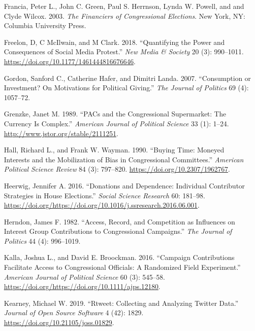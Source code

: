 \documentclass[12pt,]{article}
\begin{document}
\leavevmode\hypertarget{ref-francia2003}{}%
Francia, Peter L., John C. Green, Paul S. Herrnson, Lynda W. Powell, and
and Clyde Wilcox. 2003. \emph{The Financiers of Congressional
Elections}. New York, NY: Columbia University Press.

\leavevmode\hypertarget{ref-freelon2018}{}%
Freelon, D, C McIlwain, and M Clark. 2018. ``Quantifying the Power and
Consequences of Social Media Protest.'' \emph{New Media \& Society} 20
(3): 990--1011. \url{https://doi.org/10.1177/1461444816676646}.

\leavevmode\hypertarget{ref-gordon2007}{}%
Gordon, Sanford C., Catherine Hafer, and Dimitri Landa. 2007.
``Consumption or Investment? On Motivations for Political Giving.''
\emph{The Journal of Politics} 69 (4): 1057--72.

\leavevmode\hypertarget{ref-grenzke1989}{}%
Grenzke, Janet M. 1989. ``PACs and the Congressional Supermarket: The
Currency Is Complex.'' \emph{American Journal of Political Science} 33
(1): 1--24. \url{http://www.jstor.org/stable/2111251}.

\leavevmode\hypertarget{ref-hall1990}{}%
Hall, Richard L., and Frank W. Wayman. 1990. ``Buying Time: Moneyed
Interests and the Mobilization of Bias in Congressional Committees.''
\emph{American Political Science Review} 84 (3): 797--820.
\url{https://doi.org/10.2307/1962767}.

\leavevmode\hypertarget{ref-heerwig2016}{}%
Heerwig, Jennifer A. 2016. ``Donations and Dependence: Individual
Contributor Strategies in House Elections.'' \emph{Social Science
Research} 60: 181--98.
\url{https://doi.org/https://doi.org/10.1016/j.ssresearch.2016.06.001}.

\leavevmode\hypertarget{ref-herndon1982}{}%
Herndon, James F. 1982. ``Access, Record, and Competition as Influences
on Interest Group Contributions to Congressional Campaigns.'' \emph{The
Journal of Politics} 44 (4): 996--1019.

\leavevmode\hypertarget{ref-kalla2015}{}%
Kalla, Joshua L., and David E. Broockman. 2016. ``Campaign Contributions
Facilitate Access to Congressional Officials: A Randomized Field
Experiment.'' \emph{American Journal of Political Science} 60 (3):
545--58. \url{https://doi.org/https://doi.org/10.1111/ajps.12180}.

\leavevmode\hypertarget{ref-rtweet}{}%
Kearney, Michael W. 2019. ``Rtweet: Collecting and Analyzing Twitter
Data.'' \emph{Journal of Open Source Software} 4 (42): 1829.
\url{https://doi.org/10.21105/joss.01829}.
\end{document}
